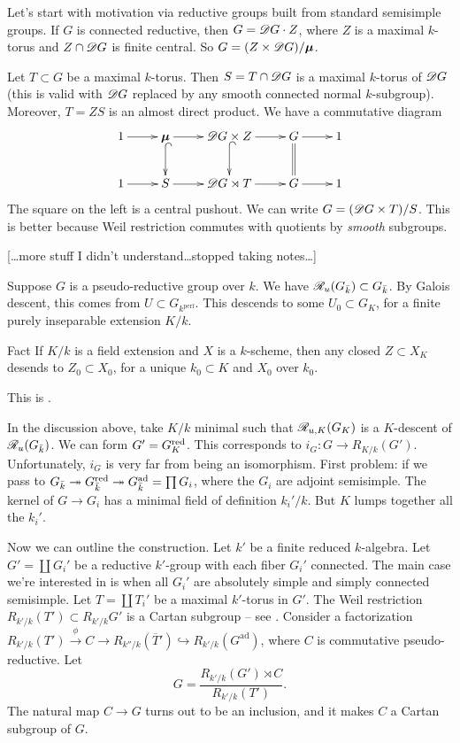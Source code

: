 Let's start with motivation via reductive groups built from standard semisimple 
groups. If $G$ is connected reductive, then $G=\mathscr{D} G\cdot Z$, where $Z$ is a 
maximal $k$-torus and $Z\cap \mathscr{D} G$ is finite central. So 
$G=(Z\times \mathscr{D} G)/\boldsymbol\mu$. 

Let $T\subset G$ be a maximal $k$-torus. Then $S=T\cap \mathscr{D} G$ is a maximal 
$k$-torus of $\mathscr{D} G$ (this is valid with $\mathscr{D} G$ replaced by any smooth 
connected normal $k$-subgroup). Moreover, $T = Z S$ is an almost direct product. 
We have a commutative diagram 
\[\xymatrix{
  1 \ar[r] 
    & \boldsymbol\mu \ar[r] \ar@{^{(}->}[d] 
    & \sD G\times Z \ar[r] \ar@{^{(}->}[d] 
    & G \ar[r] \ar@{=}[d] 
    & 1 \\
  1 \ar[r] 
    & S \ar[r] 
    & \sD G\rtimes T \ar[r] 
    & G \ar[r] 
    & 1
}\]
The square on the left is a central pushout. We can write 
$G=(\mathscr{D} G\times T)/S$. This is better because Weil restriction commutes with 
quotients by \emph{smooth} subgroups. 

[\ldots more stuff I didn't understand\ldots stopped taking notes\ldots]

Suppose $G$ is a pseudo-reductive group over $k$. We have 
$\mathscr{R}_u(G_{\bar k})\subset G_{\bar k}$. By Galois descent, this comes from 
$U\subset G_{k^\mathrm{perf}}$. This descends to some $U_0\subset G_K$, for a 
finite purely inseparable extension $K/k$. 

\begin{enonce}{Fact}
If $K/k$ is a field extension and $X$ is a $k$-scheme, then any closed 
$Z\subset X_K$ desends to $Z_0\subset X_0$, for a unique 
$k_0\subset K$ and $X_0$ over $k_0$. 
\end{enonce}
This is \cite[4.2]{ega4}. 

In the discussion above, take $K/k$ minimal such that $\mathscr{R}_{u,K}(G_K)$ is a 
$K$-descent of $\mathscr{R}_u(G_{\bar k})$. We can form 
$G'=G_K^{\mathrm{red}}$. This corresponds to 
$i_G:G\to R_{K/k}(G')$. Unfortunately, $i_G$ is very far from being an isomorphism. 
First problem: if we pass to $G_{\bar k} \twoheadrightarrow G_{\bar k}^{\mathrm{red}} \twoheadrightarrow G_{\bar k}^\mathrm{ad} = \prod G_i$, where the $G_i$ are adjoint 
semisimple. The kernel of $G\to G_i$ has a minimal field of definition 
$k_i'/k$. But $K$ lumps together all the $k_i'$. 

Now we can outline the construction. Let $k'$ be a finite reduced $k$-algebra. 
Let $G'=\coprod G_i'$ be a reductive $k'$-group with each fiber 
$G_i'$ connected. The main case we're interested in is when all $G_i'$ are 
absolutely simple and simply connected semisimple. Let 
$T=\coprod T_i'$ be a maximal $k'$-torus in $G'$. The Weil restriction 
$R_{k'/k}(T') \subset R_{k'/k} G'$ is a Cartan subgroup -- see 
\cite[A.5.15(i)]{cgp10}. Consider a factorization 
$R_{k'/k}(T')\xrightarrow\phi C \to R_{k''/k}(\overline T') \hookrightarrow R_{k'/k}(G^\mathrm{ad})$, where $C$ is commutative pseudo-reductive. Let 
\[
  G=\frac{R_{k'/k}(G')\rtimes C}{R_{k'/k}(T')}. 
\]
The natural map $C\to G$ turns out to be an inclusion, and it makes $C$ a 
Cartan subgroup of $G$. 

